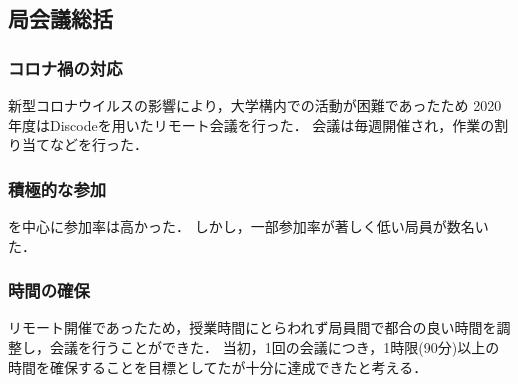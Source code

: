 \subsection*{局会議総括}

\subsubsection*{コロナ禍の対応}

新型コロナウイルスの影響により，大学構内での活動が困難であったため
2020年度はDiscodeを用いたリモート会議を行った．
会議は毎週開催され，作業の割り当てなどを行った．

\subsubsection*{積極的な参加}

\secondGrade{}を中心に参加率は高かった．
しかし，一部参加率が著しく低い局員が数名いた．

\subsubsection*{時間の確保}

リモート開催であったため，授業時間にとらわれず局員間で都合の良い時間を調整し，会議を行うことができた．
当初，1回の会議につき，1時限(90分)以上の時間を確保することを目標としてたが十分に達成できたと考える．

